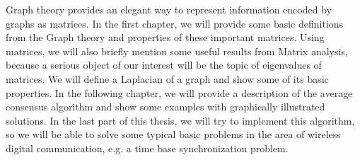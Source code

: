 Graph theory provides an elegant way to represent information encoded by graphs as matrices. In the first chapter, we will provide some basic definitions from the Graph theory and properties of these important matrices. Using matrices, we will also briefly mention some useful results from Matrix analysis, because a serious object of our interest will be the topic of eigenvalues of matrices. We will define a Laplacian of a graph and show some of its basic properties. In the following chapter, we will provide a description of the average consensus algorithm and show some examples with graphically illustrated solutions. In the last part of this thesis, we will try to implement this algorithm, so we will be able to solve some typical basic problems in the area of wireless digital communication, e.g. a time base synchronization problem. %
